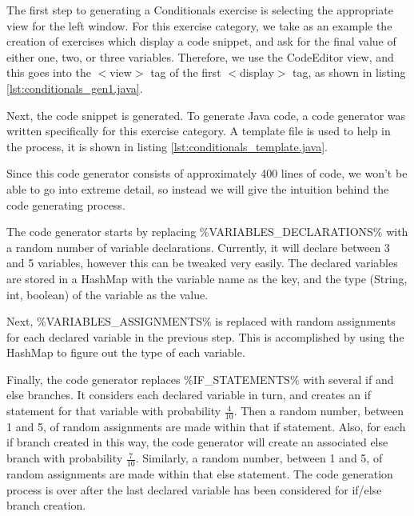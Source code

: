 The first step to generating a Conditionals exercise is selecting the appropriate view for the left window. For this exercise category, we take as an example the creation of exercises which display a code snippet, and ask for the final value of either one, two, or three variables. Therefore, we use the \textsf{CodeEditor} view, and this goes into the \textsf{$<$view$>$} tag of the first \textsf{$<$display$>$} tag, as shown in listing \ref{lst:conditionals_gen1.java}. \newline



Next, the code snippet is generated. To generate Java code, a code generator was written specifically for this exercise category. A template file is used to help in the process, it is shown in listing \ref{lst:conditionals_template.java}.\newline



Since this code generator consists of approximately 400 lines of code, we won't be able to go into extreme detail, so instead we will give the intuition behind the code generating process.\newline

The code generator starts by replacing \textsf{\%VARIABLES\_DECLARATIONS\%} with a random number of variable declarations. Currently, it will declare between 3 and 5 variables, however this can be tweaked very easily. The declared variables are stored in a \textsf{HashMap} with the variable name as the key, and the type (\textsf{String, int, boolean}) of the variable as the value.\newline

Next, \textsf{\%VARIABLES\_ASSIGNMENTS\%} is replaced with random assignments for each declared variable in the previous step. This is accomplished by using the \textsf{HashMap} to figure out the type of each variable.\newline

Finally, the code generator replaces \textsf{\%IF\_STATEMENTS\%} with several \textsf{if} and \textsf{else} branches. It considers each declared variable in turn, and creates an \textsf{if} statement for that variable with probability $\frac{4}{10}$. Then a random number, between 1 and 5, of random assignments are made within that \textsf{if} statement. Also, for each \textsf{if} branch created in this way, the code generator will create an associated \textsf{else} branch with probability $\frac{7}{10}$. Similarly, a random number, between 1 and 5, of random assignments are made within that \textsf{else} statement. The code generation process is over after the last declared variable has been considered for \textsf{if/else} branch creation.\newline

